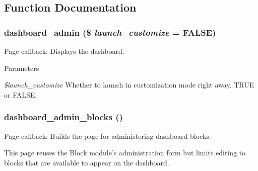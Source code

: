 \subsection{Function Documentation}
\hypertarget{dashboard_8module_ac7e281708902d92b286b4f5d31d3edad}{
\subsubsection[{dashboard\_\-admin}]{\setlength{\rightskip}{0pt plus 5cm}dashboard\_\-admin (\$ {\em launch\_\-customize} = {\ttfamily FALSE})}}
\label{dashboard_8module_ac7e281708902d92b286b4f5d31d3edad}
Page callback: Displays the dashboard.


\begin{DoxyParams}{Parameters}
\item[{\em \$launch\_\-customize}]Whether to launch in customization mode right away. TRUE or FALSE. \end{DoxyParams}
\hypertarget{dashboard_8module_a65f41fb117c7c340bcea3b03d8a03086}{
\subsubsection[{dashboard\_\-admin\_\-blocks}]{\setlength{\rightskip}{0pt plus 5cm}dashboard\_\-admin\_\-blocks ()}}
\label{dashboard_8module_a65f41fb117c7c340bcea3b03d8a03086}
Page callback: Builds the page for administering dashboard blocks.

This page reuses the Block module's administration form but limits editing to blocks that are available to appear on the dashboard.

